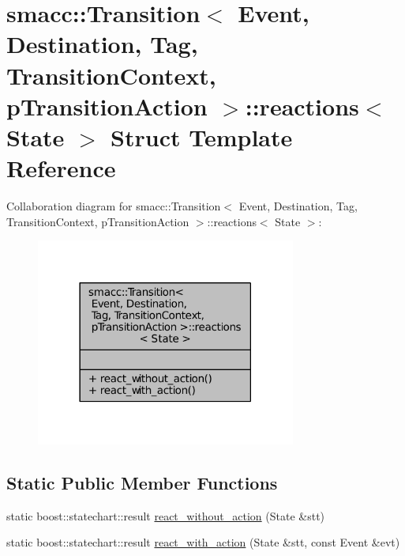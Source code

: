 \hypertarget{structsmacc_1_1Transition_1_1reactions}{}\section{smacc\+:\+:Transition$<$ Event, Destination, Tag, Transition\+Context, p\+Transition\+Action $>$\+:\+:reactions$<$ State $>$ Struct Template Reference}
\label{structsmacc_1_1Transition_1_1reactions}


Collaboration diagram for smacc\+:\+:Transition$<$ Event, Destination, Tag, Transition\+Context, p\+Transition\+Action $>$\+:\+:reactions$<$ State $>$\+:
\nopagebreak
\begin{figure}[H]
\begin{center}
\leavevmode
\includegraphics[width=242pt]{structsmacc_1_1Transition_1_1reactions__coll__graph}
\end{center}
\end{figure}
\subsection*{Static Public Member Functions}
\begin{DoxyCompactItemize}
\item 
static boost\+::statechart\+::result \hyperlink{structsmacc_1_1Transition_1_1reactions_a96a69cf5b0cbd1e8fc49ca57efb37581}{react\+\_\+without\+\_\+action} (State \&stt)
\item 
static boost\+::statechart\+::result \hyperlink{structsmacc_1_1Transition_1_1reactions_a843ddc3d10e2aec66a702745852455c3}{react\+\_\+with\+\_\+action} (State \&stt, const Event \&evt)
\end{DoxyCompactItemize}


